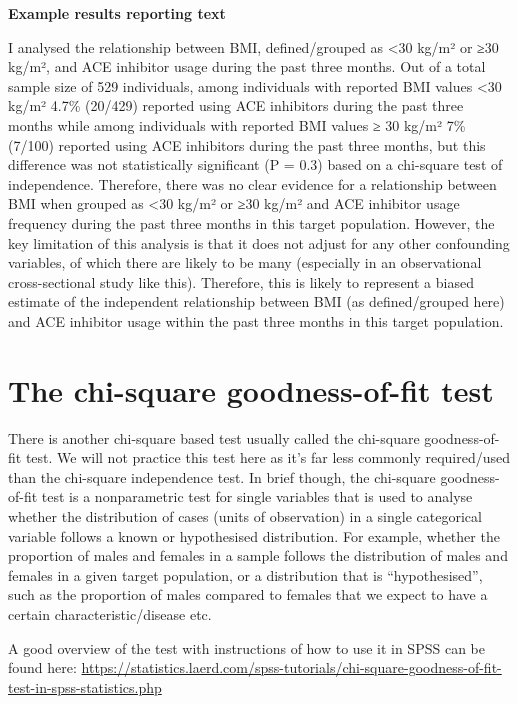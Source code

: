 \documentclass[
]{book}
\begin{document}
\textbf{Example results reporting text}

I analysed the relationship between BMI, defined/grouped as \textless30 kg/m² or ≥30 kg/m², and ACE inhibitor usage during the past three months. Out of a total sample size of 529 individuals, among individuals with reported BMI values \textless30 kg/m² 4.7\% (20/429) reported using ACE inhibitors during the past three months while among individuals with reported BMI values ≥ 30 kg/m² 7\% (7/100) reported using ACE inhibitors during the past three months, but this difference was not statistically significant (P = 0.3) based on a chi-square test of independence. Therefore, there was no clear evidence for a relationship between BMI when grouped as \textless30 kg/m² or ≥30 kg/m² and ACE inhibitor usage frequency during the past three months in this target population. However, the key limitation of this analysis is that it does not adjust for any other confounding variables, of which there are likely to be many (especially in an observational cross-sectional study like this). Therefore, this is likely to represent a biased estimate of the independent relationship between BMI (as defined/grouped here) and ACE inhibitor usage within the past three months in this target population.

\hypertarget{the-chi-square-goodness-of-fit-test}{%
\chapter{The chi-square goodness-of-fit test}\label{the-chi-square-goodness-of-fit-test}}

There is another chi-square based test usually called the chi-square goodness-of-fit test. We will not practice this test here as it's far less commonly required/used than the chi-square independence test. In brief though, the chi-square goodness-of-fit test is a nonparametric test for single variables that is used to analyse whether the distribution of cases (units of observation) in a single categorical variable follows a known or hypothesised distribution. For example, whether the proportion of males and females in a sample follows the distribution of males and females in a given target population, or a distribution that is ``hypothesised'', such as the proportion of males compared to females that we expect to have a certain characteristic/disease etc.

A good overview of the test with instructions of how to use it in SPSS can be found here: \url{https://statistics.laerd.com/spss-tutorials/chi-square-goodness-of-fit-test-in-spss-statistics.php}
\end{document}
